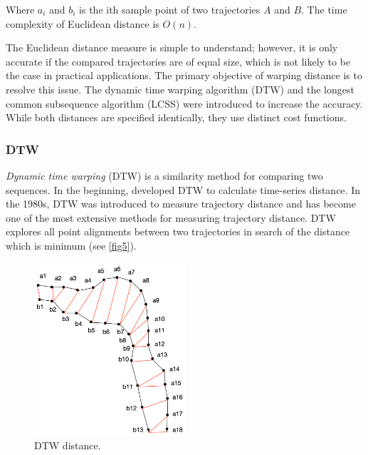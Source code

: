 \documentclass[a4paper, 12pt]{article}
\begin{document}
Where $a_{i}$ and $b_{i}$ is the ith sample point of two trajectories $A$ and $B$. The time complexity of Euclidean distance is $O(n)$. 

The Euclidean distance measure is simple to understand; however, it is only accurate if the compared trajectories are of equal size, which is not likely to be the case in practical applications. The primary objective of warping distance is to resolve this issue. The dynamic time warping algorithm (DTW) \citep{kruskal1983overview} and the longest common subsequence algorithm (LCSS) \citep{kearney1990stream} were introduced to increase the accuracy. While both distances are specified identically, they use distinct cost functions.

\subsubsection{DTW}
\textit{Dynamic time warping} (DTW) is a similarity method for comparing two sequences. In the beginning, \cite{myers1980performance} developed DTW to calculate time-series distance. In the 1980s, DTW was introduced to measure trajectory distance \citep{kruskal1983overview} and has become one of the most extensive methods for measuring trajectory distance. DTW explores all point alignments between two trajectories in search of the distance which is minimum (see \autoref{fig5}). 

\begin{figure}[ht]
    \centering
    \includegraphics[width=0.5\textwidth]{DTW.png}
    \caption{DTW distance.}
    \label{fig5}
\end{figure}
\end{document}
